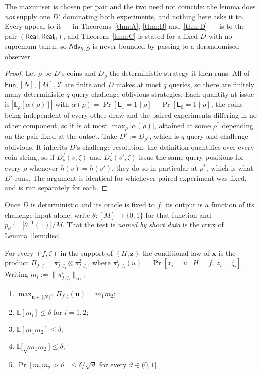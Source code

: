 \documentclass{aicr-solution}
\newcommand{\Fun}{\mathsf{Fun}}
\newcommand{\Adv}{\mathsf{Adv}}
\newcommand{\Real}{\mathsf{Real}}
\newcommand{\Prob}[1]{\Pr\!\left[#1\right]}
\newcommand{\Exp}{\mathbb{E}}
\newcommand{\bits}{\{0,1\}}
\newcommand{\vx}{\mathbf{x}}
\newcommand{\vz}{\mathbf{z}}
\newcommand{\vu}{\mathbf{u}}
\begin{document}
The maximiser is chosen per pair and the two need not coincide: the lemma does
\emph{not} supply one $D'$ dominating both experiments, and nothing here asks it
to. Every appeal to it --- in Theorems~\ref{thm:A}, \ref{thm:B} and~\ref{thm:D}
--- is to the pair $(\Real,\Real_0)$, and Theorem~\ref{thm:C} is stated for a
fixed $D$ with no supremum taken, so $\Adv_{\mathcal Y,D}$ is never bounded by
passing to a derandomised observer.

\begin{proof}
Let $\rho$ be $D$'s coins and $D_\rho$ the deterministic strategy it then runs.
All of $\Fun,[N],[M],\mathcal Z$ are finite and $D$ makes at most $q$ queries, so
there are finitely many deterministic $q$-query challenge-oblivious strategies.
Each quantity at issue is $|\Exp_\rho[\alpha(\rho)]|$ with
$\alpha(\rho)=\Prob{\mathsf E_1=1\mid\rho}-\Prob{\mathsf E_0=1\mid\rho}$, the
coins being independent of every other draw and the paired experiments differing
in no other component; so it is at most $\max_\rho|\alpha(\rho)|$, attained at
some $\rho^{*}$ depending on the pair fixed at the outset. Take
$D':=D_{\rho^{*}}$, which is $q$-query and challenge-oblivious. It inherits $D$'s challenge resolution: the definition
quantifies over every coin string, so if $D^{f}_{\rho}(v,\zeta)$ and
$D^{f}_{\rho}(v',\zeta)$ issue the same query positions for every $\rho$ whenever
$h(v)=h(v')$, they do so in particular at $\rho^{*}$, which is what $D'$ runs.
The argument is identical for whichever paired experiment was fixed, and is run
separately for each.
\end{proof}

Once $D$ is deterministic and its oracle is fixed to $f$, its output is a
function of its challenge input alone; write $\theta:[M]\to\bits$ for that
function and $p_\theta:=|\theta^{-1}(1)|/M$. That the test is \emph{named by
short data} is the crux of Lemma~\ref{lem:disc}.

\begin{lemma}\label{lem:prod}
For every $(f,\zeta)$ in the support of $(H,\vz)$ the conditional law of $\vx$ is
the product $\Pi_{f,\zeta}=\pi^{1}_{f,\zeta_1}\otimes\pi^{2}_{f,\zeta_2}$, where
$\pi^{i}_{f,\zeta_i}(u)=\Prob{x_i=u\mid H=f,\ z_i=\zeta_i}$. Writing
$m_i:=\|\pi^{i}_{f,\zeta_i}\|_\infty$:
\begin{enumerate}
\item $\max_{\vu\in[N]^2}\Pi_{f,\zeta}(\vu)=m_1m_2$;
\item $\Exp[m_i]\le\delta$ for $i=1,2$;
\item $\Exp[m_1m_2]\le\delta$;
\item $\Exp\bigl[\sqrt{m_1m_2}\bigr]\le\delta$;
\item $\Prob{m_1m_2>\vartheta}\le\delta/\sqrt\vartheta$ for every
  $\vartheta\in(0,1]$.
\end{enumerate}
\end{lemma}
\end{document}
